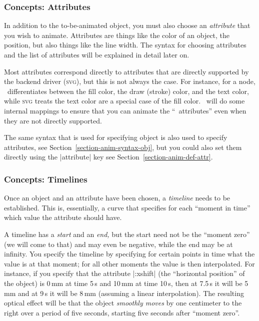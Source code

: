 \subsubsection{Concepts: Attributes}

In addition to the to-be-animated object, you must also choose an
\emph{attribute} that you wish to animate. Attributes are things like
the color of an object, the position, but also things like the line
width. The syntax for choosing attributes and the list of attributes
will be explained in detail later on.

Most attributes correspond directly to attributes that are directly
supported by the backend driver (\textsc{svg}), but this is not always
the case. For instance, for a node, \tikzname\ differentiates between
the fill color, the draw (stroke) color, and the text color, while
\textsc{svg} treats the text color are a special case of the fill
color. \tikzname\ will do some internal mappings to ensure that you
can animate the ``\tikzname\ attributes'' even when they are not
directly supported.

The same syntax that is used for specifying object is also used to
specify attributes, see Section~\ref{section-anim-syntax-obj}, but you
could also set them directly using the |attribute| key see
Section~\ref{section-anim-def-attr}. 

\subsubsection{Concepts: Timelines}

Once an object and an attribute have been chosen, a \emph{timeline}
needs to be established. This is, essentially, a curve that specifies
for each ``moment in time'' which value the attribute should have.

A timeline has a \emph{start} and an \emph{end,} but the start need
not be the ``moment zero'' (we will come to that) and may even be
negative, while the end may be at infinity. You specify the timeline
by specifying for certain points in time what the value is at that
moment; for all other moments the value is then interpolated. For
instance, if you specify that the attribute |:xshift| (the
``horizontal position'' of the object) is 0\,mm at time 5\,s and 10\,mm
at time 10\,s, then at 7.5\,s it will be 5\,mm and at 9\,s it will
be 8\,mm (assuming a linear interpolation). The resulting optical
effect will be that the object \emph{smoothly moves} by one centimeter
to the right over a period of five seconds, starting five seconds
after ``moment zero''.

